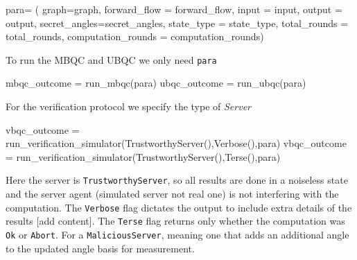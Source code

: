\documentclass[
]{article}
\newenvironment{Shaded}{}{}
\newcommand{\FunctionTok}[1]{\textcolor[rgb]{0.02,0.16,0.49}{#1}}
\newcommand{\NormalTok}[1]{#1}
\newcommand{\OperatorTok}[1]{\textcolor[rgb]{0.40,0.40,0.40}{#1}}
\begin{document}
\begin{Shaded}
\begin{Highlighting}[]
\NormalTok{    para}\OperatorTok{=}\NormalTok{ (}
\NormalTok{        graph}\OperatorTok{=}\NormalTok{graph,}
\NormalTok{        forward\_flow }\OperatorTok{=}\NormalTok{ forward\_flow,}
\NormalTok{        input }\OperatorTok{=}\NormalTok{ input,}
\NormalTok{        output }\OperatorTok{=}\NormalTok{ output,}
\NormalTok{        secret\_angles}\OperatorTok{=}\NormalTok{secret\_angles,}
\NormalTok{        state\_type }\OperatorTok{=}\NormalTok{ state\_type,}
\NormalTok{        total\_rounds }\OperatorTok{=}\NormalTok{ total\_rounds,}
\NormalTok{        computation\_rounds }\OperatorTok{=}\NormalTok{ computation\_rounds)}
\end{Highlighting}
\end{Shaded}

To run the MBQC and UBQC we only need \texttt{para}

\begin{Shaded}
\begin{Highlighting}[]
\NormalTok{    mbqc\_outcome }\OperatorTok{=} \FunctionTok{run\_mbqc}\NormalTok{(para)}
\NormalTok{    ubqc\_outcome }\OperatorTok{=} \FunctionTok{run\_ubqc}\NormalTok{(para)}
\end{Highlighting}
\end{Shaded}

For the verification protocol we specify the type of \emph{Server}

\begin{Shaded}
\begin{Highlighting}[]
\NormalTok{    vbqc\_outcome }\OperatorTok{=} \FunctionTok{run\_verification\_simulator}\NormalTok{(}\FunctionTok{TrustworthyServer}\NormalTok{(),}\FunctionTok{Verbose}\NormalTok{(),para)}
\NormalTok{    vbqc\_outcome }\OperatorTok{=} \FunctionTok{run\_verification\_simulator}\NormalTok{(}\FunctionTok{TrustworthyServer}\NormalTok{(),}\FunctionTok{Terse}\NormalTok{(),para)}
\end{Highlighting}
\end{Shaded}

Here the server is \texttt{TrustworthyServer}, so all results are done
in a noiseless state and the server agent (simulated server not real
one) is not interfering with the computation. The \texttt{Verbose} flag
dictates the output to include extra details of the results {[}add
content{]}. The \texttt{Terse} flag returns only whether the computation
was \texttt{Ok} or \texttt{Abort}. For a \texttt{MaliciousServer},
meaning one that adds an additional angle to the updated angle basis for
measurement.
\end{document}
